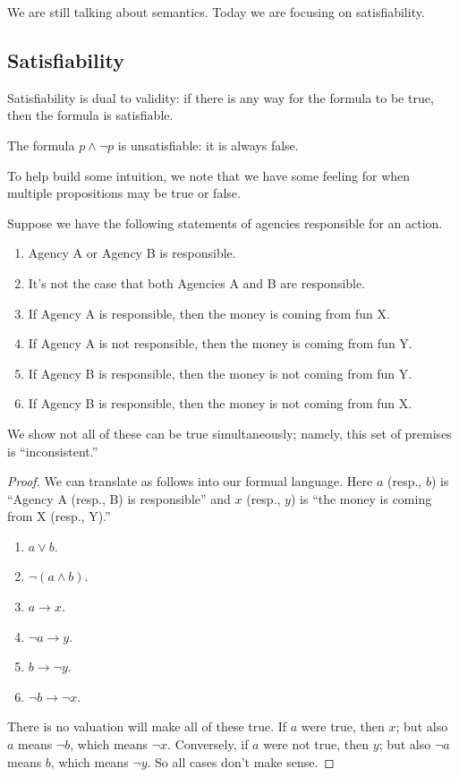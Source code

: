 
We are still talking about semantics. Today we are focusing on satisfiability.

\subsection{Satisfiability}
Satisfiability is dual to validity: if there is any way for the formula to be true, then the formula is satisfiable.
\begin{nex}
	The formula $p\land\lnot p$ is unsatisfiable: it is always false.
\end{nex}
To help build some intuition, we note that we have some feeling for when multiple propositions may be true or false.
\begin{exe}
	Suppose we have the following statements of agencies responsible for an action.
	\begin{enumerate}
		\item Agency A or Agency B is responsible.
		\item It's not the case that both Agencies A and B are responsible.
		\item If Agency A is responsible, then the money is coming from fun X.
		\item If Agency A is not responsible, then the money is coming from fun Y.
		\item If Agency B is responsible, then the money is not coming from fun Y.
		\item If Agency B is responsible, then the money is not coming from fun X.
	\end{enumerate}
	We show not all of these can be true simultaneously; namely, this set of premises is ``inconsistent.''
\end{exe}
\begin{proof}
	We can translate as follows into our formual language. Here $a$ (resp., $b$) is ``Agency A (resp., B) is responsible'' and $x$ (resp., $y$) is ``the money is coming from X (resp., Y).''
	\begin{enumerate}
		\item $a\lor b$.
		\item $\lnot(a\land b)$.
		\item $a\to x$.
		\item $\lnot a\to y$.
		\item $b\to\lnot y$.
		\item $\lnot b\to\lnot x$.
	\end{enumerate}
	There is no valuation will make all of these true. If $a$ were true, then $x$; but also $a$ means $\lnot b$, which means $\lnot x$. Conversely, if $a$ were not true, then $y$; but also $\lnot a$ means $b$, which means $\lnot y$. So all cases don't make sense.
\end{proof}
